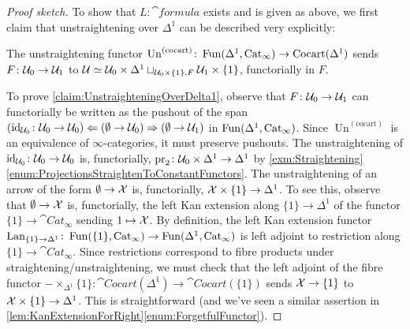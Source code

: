 \begin{proof}[Proof sketch]
	To show that $L\colon \cat{formula}$ exists and is given as above, we first claim that unstraightening over $\Delta^1$ can be described very explicitly:
	\begin{alphanumerate}\itshape
		\item[\boxtimes] The unstraightening functor $\operatorname{Un}^{(\mathrm{cocart})}\colon \operatorname{Fun}(\Delta^1,\mathrm{Cat}_\infty)\rightarrow \mathrm{Cocart}(\Delta^1)$ sends $F\colon \mathcal{U}_0\rightarrow \mathcal{U}_1$ to $\mathcal{U}\simeq \mathcal{U}_0\times\Delta^1\sqcup_{\mathcal{U}_0\times\{1\},F}\mathcal{U}_1\times\{1\}$, functorially in $F$.\label{claim:UnstraighteningOverDelta1} 
	\end{alphanumerate}
	To prove \cref{claim:UnstraighteningOverDelta1}, observe that $F\colon \mathcal{U}_0\rightarrow \mathcal{U}_1$ can functorially be written as the pushout of the span $(\operatorname{id}_{\mathcal{U}_0}\colon \mathcal{U}_0\rightarrow \mathcal{U}_0)\Leftarrow (\emptyset \rightarrow \mathcal{U}_0) \Rightarrow (\emptyset \rightarrow \mathcal{U}_1)$ in $\operatorname{Fun}(\Delta^1,\mathrm{Cat}_\infty)$. Since $\operatorname{Un}^{(\mathrm{cocart})}$ is an equivalence of $\infty$-categories, it must preserve pushouts. The unstraightening of $\operatorname{id}_{\mathcal{U}_0}\colon \mathcal{U}_0\rightarrow \mathcal{U}_0$ is, functorially, $\operatorname{pr}_2\colon \mathcal{U}_0\times\Delta^1\rightarrow \Delta^1$ by \cref{exm:Straightening}\cref{enum:ProjectionsStraightenToConstantFunctors}. The unstraightening of an arrow of the form $\emptyset \rightarrow \mathcal{X}$ is, functorially, $\mathcal{X}\times\{1\}\rightarrow \Delta^1$. To see this, observe that $\emptyset\rightarrow \mathcal{X}$ is, functorially, the left Kan extension along $\{1\}\rightarrow \Delta^1$ of the functor $\{1\}\rightarrow \cat{Cat}_\infty$ sending $1\mapsto \mathcal{X}$. By definition, the left Kan extension functor $\operatorname{Lan}_{\{1\}\rightarrow \Delta^1}\colon \operatorname{Fun}(\{1\},\mathrm{Cat}_\infty)\rightarrow \operatorname{Fun}(\Delta^1,\mathrm{Cat}_\infty)$ is left adjoint to restriction along $\{1\}\rightarrow \cat{Cat}_\infty$. Since restrictions correspond to fibre products under straightening/unstraightening, we must check that the left adjoint of the fibre functor $-\times_{\Delta^1}\{1\}\colon \cat{Cocart}(\Delta^1)\rightarrow \cat{Cocart}(\{1\})$ sends $\mathcal{X}\rightarrow \{1\}$ to $\mathcal{X}\times\{1\}\rightarrow \Delta^1$. This is straightforward (and we've seen a similar assertion in \cref{lem:KanExtensionForRight}\cref{enum:ForgetfulFunctor}).
	

\end{proof}
